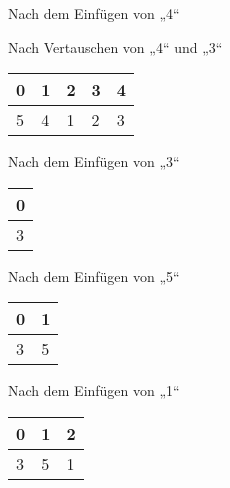 \documentclass{bschlangaul-aufgabe}
\begin{document}
\begin{enumerate}
\begin{enumerate}
\begin{liDiagramm}{Nach dem Einfügen von „4“}
\end{liDiagramm}

\begin{liDiagramm}{Nach Vertauschen von „4“ und „3“}
\begin{tabular}{lllll}
\bf{0} & \bf{1} & \bf{2} & \bf{3} & \bf{4} \\
\hline
5      & 4      & 1      & 2      & 3      \\
\end{tabular}

\end{liDiagramm}

%


\begin{liDiagramm}{Nach dem Einfügen von „3“}
\begin{tabular}{l}
\bf{0} \\
\hline
3      \\
\end{tabular}

\end{liDiagramm}

\begin{liDiagramm}{Nach dem Einfügen von „5“}
\begin{tabular}{ll}
\bf{0} & \bf{1} \\
\hline
3      & 5      \\
\end{tabular}

\end{liDiagramm}

\begin{liDiagramm}{Nach dem Einfügen von „1“}
\begin{tabular}{lll}
\bf{0} & \bf{1} & \bf{2} \\
\hline
3      & 5      & 1      \\
\end{tabular}


\end{liDiagramm}
\end{enumerate}
\end{enumerate}
\end{document}
